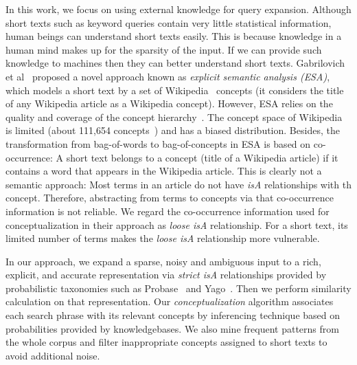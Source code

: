 In this work, we focus on using external knowledge for query
expansion. Although short texts such as keyword queries contain very
little statistical information, human beings can understand short
texts easily.  This is because knowledge in a human mind makes up for
the sparsity of the input.  If we can provide such knowledge to
machines then they can better understand short texts.  Gabrilovich et
al~\cite{gabrilovich:semanticanalysis} proposed a novel approach known
as {\em explicit semantic analysis (ESA)}, which models a short text
by a set of Wikipedia~\cite{wiki:tool} concepts (it considers the
title of any Wikipedia article as a Wikipedia concept).  However, ESA
relies on the quality and coverage of the concept
hierarchy~\cite{chen:concepthierarchy}.  The concept space of
Wikipedia is limited (about 111,654 concepts~\cite{wu:manyconcepts}) and has a biased
distribution.  %
Besides, the transformation from bag-of-words to bag-of-concepts in
ESA is based on co-occurrence: A short text belongs to a concept
(title of a Wikipedia article) if it contains a word that appears in the
Wikipedia article.  This is clearly not a semantic approach: Most
terms in an article do not have \emph{isA} relationships with th
concept.  Therefore, abstracting from terms to concepts via that
co-occurrence information is not reliable.  We regard the
co-occurrence information used for conceptualization in their approach
as \emph{loose isA} relationship.  For a short text, its limited
number of terms makes the \emph{loose isA} relationship more
vulnerable.


In our approach, we expand a sparse, noisy and ambiguous input to a
rich, explicit, and accurate representation via \emph{strict isA}
relationships provided by probabilistic taxonomies such as
Probase~\cite{wu:manyconcepts} and Yago~\cite{SuchanekKW07yago}.  Then
we perform similarity calculation on that representation.  Our
\emph{conceptualization} algorithm associates each search phrase with
its relevant concepts by inferencing technique based on probabilities
provided by knowledgebases.  We also mine frequent patterns from the
whole corpus and filter inappropriate concepts assigned to short texts
to avoid additional noise.



